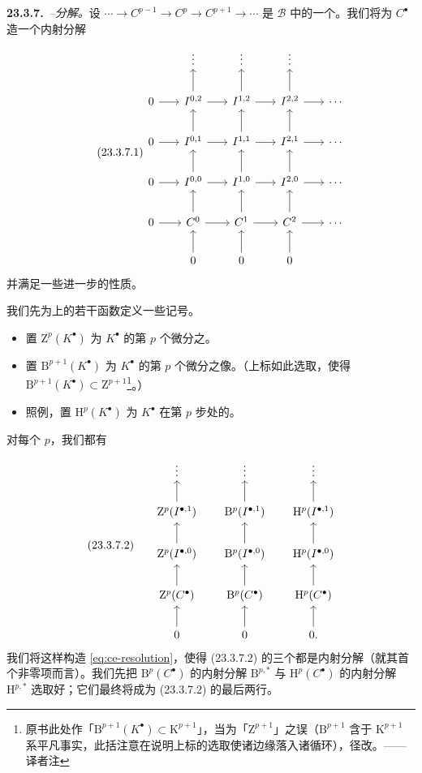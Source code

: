 \textbf{23.3.7.}\ \emph{\trCartan--\trEilenberg{}分解。}\quad 设 $\cdots\to C^{p-1}\to C^p\to C^{p+1}\to\cdots$ 是\trAbelianCategory{} $\mathscr{B}$ 中的一个\trComplexN。我们将为 $C^\bullet$ 造一个内射分解
\begin{equation*}\tag{23.3.7.1}\label{eq:ce-resolution}
\begin{tikzcd}[row sep=2em, column sep=1.8em]
 & \vdots & \vdots & \vdots & \\
0 \ar[r] & I^{0,2} \ar[r] \ar[u] & I^{1,2} \ar[r] \ar[u] & I^{2,2} \ar[r] \ar[u] & \cdots \\
0 \ar[r] & I^{0,1} \ar[r] \ar[u] & I^{1,1} \ar[r] \ar[u] & I^{2,1} \ar[r] \ar[u] & \cdots \\
0 \ar[r] & I^{0,0} \ar[r] \ar[u] & I^{1,0} \ar[r] \ar[u] & I^{2,0} \ar[r] \ar[u] & \cdots \\
0 \ar[r] & C^0 \ar[r] \ar[u] & C^1 \ar[r] \ar[u] & C^2 \ar[r] \ar[u] & \cdots \\
 & 0 \ar[u] & 0 \ar[u] & 0 \ar[u] &
\end{tikzcd}
\end{equation*}
并满足一些进一步的性质。

我们先为\trComplexN{}上的若干函数定义一些记号。
\begin{itemize}
\item 置 $\mathrm{Z}^p(K^\bullet)$ 为\trComplexN{} $K^\bullet$ 的第 $p$ 个微分之\trKernel。
\item 置 $\mathrm{B}^{p+1}(K^\bullet)$ 为\trComplexN{} $K^\bullet$ 的第 $p$ 个微分之像。（上标如此选取，使得 $\mathrm{B}^{p+1}(K^\bullet)\subset\mathrm{Z}^{p+1}$\footnote{原书此处作「$\mathrm{B}^{p+1}(K^\bullet)\subset\mathrm{K}^{p+1}$」，当为「$\mathrm{Z}^{p+1}$」之误（$\mathrm{B}^{p+1}$ 含于 $\mathrm{K}^{p+1}$ 系平凡事实，此括注意在说明上标的选取使诸边缘落入诸循环），径改。——译者注}。）
\item 照例，置 $\mathrm{H}^p(K^\bullet)$ 为\trComplexN{} $K^\bullet$ 在第 $p$ 步处的\trCohomology。
\end{itemize}
对每个 $p$，我们都有\trComplexes
\begin{equation*}\tag{23.3.7.2}\label{eq:ce-three}
\begin{tikzcd}[row sep=1.9em, column sep=1.6em]
 & \vdots & \vdots & \vdots & \\
 & \mathrm{Z}^p(I^{\bullet,1}) \ar[u] & \mathrm{B}^p(I^{\bullet,1}) \ar[u] & \mathrm{H}^p(I^{\bullet,1}) \ar[u] & \\
 & \mathrm{Z}^p(I^{\bullet,0}) \ar[u] & \mathrm{B}^p(I^{\bullet,0}) \ar[u] & \mathrm{H}^p(I^{\bullet,0}) \ar[u] & \\
 & \mathrm{Z}^p(C^\bullet) \ar[u] & \mathrm{B}^p(C^\bullet) \ar[u] & \mathrm{H}^p(C^\bullet) \ar[u] & \\
 & 0 \ar[u] & 0 \ar[u] & 0. \ar[u] &
\end{tikzcd}
\end{equation*}
我们将这样构造 \eqref{eq:ce-resolution}，使得 (23.3.7.2) 的三个\trComplexes{}都是内射分解（就其首个非零项而言）。我们先把 $\mathrm{B}^p(C^\bullet)$ 的内射分解 $\mathrm{B}^{p,\ast}$ 与 $\mathrm{H}^p(C^\bullet)$ 的内射分解 $\mathrm{H}^{p,\ast}$ 选取好；它们最终将成为 (23.3.7.2) 的最后两行。

